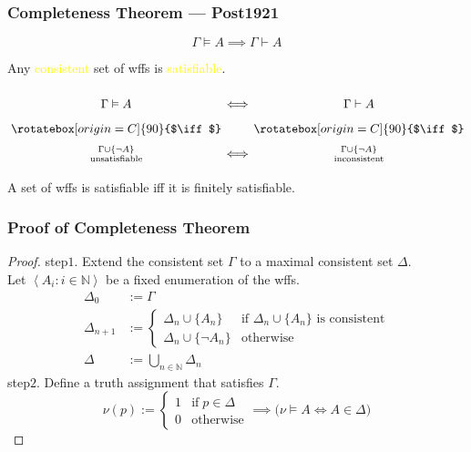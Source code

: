 \documentclass[UTF8,aspectratio=43,11pt,colorlinks,compress,openany]{beamer}%
\begin{document}
\begin{frame}\frametitle{Completeness Theorem --- Post1921}
		\begin{theorem}
			\[\Gamma\vDash A\implies\Gamma\vdash A\]
		\end{theorem}
		\begin{corollary}
			Any \textcolor{yellow}{consistent} set of wffs is \textcolor{yellow}{satisfiable}.
		\end{corollary}\vspace*{-3ex}
			{\Large \[\arraycolsep=0.7pt\def\arraystretch{1.7}
					\begin{array}{cccc}
					&\Gamma\vDash A&\iff&\Gamma\vdash A\\
					&\rotatebox[origin=C]{90}{$\iff$}&&\rotatebox[origin=C]{90}{$\iff$}\\
					&\Gamma\cup\{\neg A\}\atop{\text{unsatisfiable}}&\iff&\Gamma\cup\{\neg A\}\atop{\text{inconsistent}}
					\end{array}
					\]}
		\begin{corollary}
			A set of wffs is satisfiable iff it is finitely satisfiable.
		\end{corollary}
\end{frame}

\begin{frame}\frametitle{Proof of Completeness Theorem}
	\begin{proof}
		step$1$. Extend the consistent set $\Gamma$ to a maximal consistent set $\Delta$.\\
		Let $\left\langle A_i: i\in\mathbb{N}\right\rangle$ be a fixed enumeration of the wffs.
		\begin{align*}
		\Delta_0&:=\Gamma\\
		\Delta_{n+1}&:=
		\begin{cases}
		\Delta_n\cup\{A_n\} &\text{if $\Delta_n\cup\{A_n\}$ is consistent}\\
		\Delta_n\cup\{\neg A_n\} &\text{otherwise}
		\end{cases}\\
		\Delta&:=\bigcup\limits_{n\in\mathbb{N}}\Delta_n
		\end{align*}
		step$2$. Define a truth assignment that satisfies $\Gamma$.
		\[\nu(p):=
		\begin{cases}
		1 &\text{if}\; p\in\Delta\\
		0 &\text{otherwise}
		\end{cases}\implies\big(\nu\vDash A\iff A\in\Delta\big)\]
	\end{proof}
\end{frame}
\end{document}
